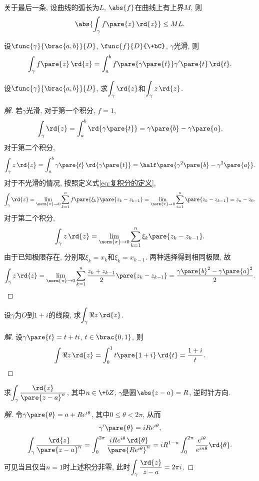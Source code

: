 \documentclass{ctexart}
\begin{document}
关于最后一条, 设曲线的弧长为$L$, $\abs{f}$在曲线上有上界$M$, 则
\[ \abs{\int_\gamma f\pare{z}\,\rd{z}} \le ML. \]
\begin{proposition}
    设$\func{\gamma}{\brac{a,b}}{D}$, $\func{f}{D}{\+bC}$, $\gamma$光滑, 则
    \[ \int_\gamma f\pare{z}\,\rd{z} = \int_a^b f\pare{\gamma\pare{t}}\gamma'\pare{t}\,\rd{t}. \]
\end{proposition}
\begin{sample}
    \begin{ex}
        \label{ex:基本曲线积分}
        设$\func{\gamma}{\brac{a,b}}{D}$, 求$\displaystyle \int_\gamma\rd{z}$和$\displaystyle\int_\gamma z\,\rd{z}$.
    \end{ex}
    \begin{proof}[解]
        若$\gamma$光滑, 对于第一个积分, $f=1$,
        \[ \int_\gamma\rd{z} = \int_a^b \rd{\gamma\pare{t}} = \gamma\pare{b} - \gamma\pare{a}. \]
        对于第二个积分,
        \[ \int_\gamma z\,\rd{z} = \int_a^b \gamma\pare{t}\,\rd{\gamma\pare{t}} = \half\pare{\gamma^2\pare{b} - \gamma^2\pare{a}}. \]
        对于不光滑的情况, 按照定义式\eqref{eq:复积分的定义},
        \[ \int_\gamma \rd{z} = \lim_{\norm{\pi}\rightarrow 0}\sum_{k=1}^n f\pare{\xi_k}\pare{z_k - z_{k-1}} = \lim_{\norm{\pi}\rightarrow 0} \sum_{i=1}^n \pare{z_k - z_{k-1}} = z_n - z_0. \]
        对于第二个积分,
        \[ \int_\gamma z\,\rd{z} = \lim_{\norm{\pi}\rightarrow 0} \sum_{k=1}^n \xi_k \pare{z_k - z_{k-1}}. \]
        由于已知极限存在, 分别取$\xi_k = x_k$和$\xi_k = x_{k-1}$. 两种选择得到相同极限, 故
        \[ \int_\gamma z\,\rd{z} = \lim_{\norm{\pi}\rightarrow 0} \sum_{k=1}^n \frac{z_k+z_{k-1}}{2}\pare{z_k - z_{k-1}} = \frac{\gamma\pare{b}^2 - \gamma\pare{a}^2}{2}. \qedhere \] 
    \end{proof}
\end{sample}
\begin{sample}
    \begin{ex}
        设$\gamma$为$O$到$1+i$的线段, 求$\displaystyle \int_\gamma \Re z\,\rd{z}$.
    \end{ex}
    \begin{proof}[解]
        设$\gamma\pare{t} = t+ti$, $t\in\brac{0,1}$, 则
        \[ \int \Re z\,\rd{z} = \int_0^1 t\pare{1+i}\,\rd{t} = \frac{1+i}{t}. \qedhere \]
    \end{proof}
\end{sample}
\begin{sample}
    \begin{ex}
        求$\displaystyle \int_\gamma \frac{\rd{z}}{\pare{z-a}^n}$, 其中$n\in \+bZ$, $\gamma$是圆$\abs{z-a}=R$, 逆时针方向.
    \end{ex}
    \begin{proof}[解]
        令$\gamma\pare{\theta} = a+Re^{i\theta}$, 其中$0\le \theta < 2\pi$, 从而
        \[ \gamma'\pare{\theta} = iRe^{i\theta}, \]
        \[ \int_\gamma \frac{\rd{z}}{\pare{z-a}^n} = \int_0^{2\pi} \frac{iRe^{i\theta}\,\rd{\theta}}{\pare{Re^{i\theta}}^n} = iR^{1-n}\int_0^{2\pi} \frac{e^{i\theta}}{e^{in\theta}}\rd{\theta}. \]
        可见当且仅当$n=1$时上述积分非零, 此时$\displaystyle \int_\gamma \frac{\rd{z}}{z-a} = 2\pi i$.
    \end{proof}
\end{sample}
\end{document}
